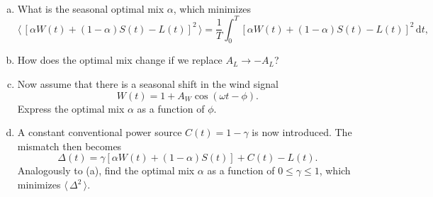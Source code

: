 \documentclass[11pt,a4paper,fleqn]{scrartcl}
\newcommand{\expect}[1]{\langle\,#1\,\rangle}
\begin{document}
~\\
\begin{enumerate}[(a)]
 \item What is the seasonal optimal mix \(\alpha\), which minimizes
       \begin{equation*}
        \expect{\left[ \alpha W(t) + (1-\alpha) S(t) - L(t) \right]^2} = \frac1T \int_0^T \left[ \alpha W(t) + (1-\alpha) S(t) - L(t) \right]^2 \,\mathrm d t
        ,
       \end{equation*}
 \item How does the optimal mix change if we replace \(A_L \to -A_L\)?
 \item Now assume that there is a seasonal shift in the wind signal
       \begin{equation*}
        W(t) = 1 + A_W \cos \left( \omega t - \phi \right)
        .
       \end{equation*}
       Express the optimal mix \(\alpha\) as a function of \(\phi\).
 \item A constant conventional power source \(C(t) = 1 - \gamma\) is now introduced. The mismatch then becomes
       \begin{equation*}
        \Delta(t) = \gamma \left[ \alpha W(t) + (1-\alpha) S(t) \right] + C(t) - L(t)
        .
       \end{equation*}
       Analogously to (a), find the optimal mix \(\alpha\) as a function of \(0 \leq \gamma \leq 1\), which minimizes \(\expect{\Delta^2}\).
\end{enumerate}
\end{document}
